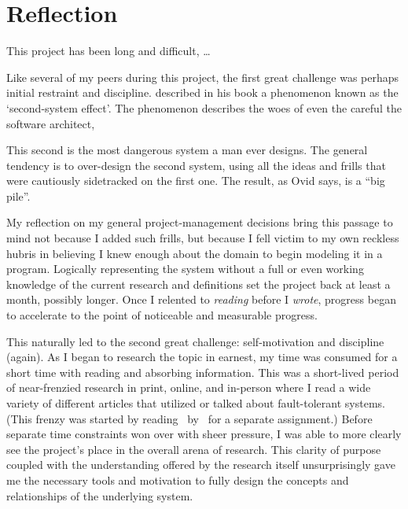\section{Reflection}
\label{sec:reflection}

This project has been long and difficult, \dots

Like several of my peers during this project,
  the first great challenge was perhaps initial restraint and discipline.
\citeauthor{brooks:mythical-man-month} described in his book 
  a phenomenon known as the \enquote*{second-system effect}.
The phenomenon describes the woes of even the careful the software architect,
\begin{displayquote}
  This second is the most dangerous system a man ever designs.
  \Elide
  The general tendency is to over-design the second system,
    using all the ideas and frills that were cautiously sidetracked on the first one.
  The result, as Ovid says, is a \enquote{big pile}.
\end{displayquote}
My reflection on my general project-management decisions bring this passage to mind
  not because I added such frills, but because I fell victim to my own reckless hubris
  in believing I knew enough about the domain to begin modeling it in a program.
%
Logically representing the system without a full \Dash or even working \Dash
  knowledge of the current research and definitions set the project back at least a month, possibly longer.
Once I relented to \emph{reading} before I \emph{wrote},
  progress began to accelerate to the point of noticeable and measurable progress.

This naturally led to the second great challenge: self-motivation and discipline (again).
As I began to research the topic in earnest,
  my time was consumed for a short time with reading and absorbing information.
This was a short-lived period of near-frenzied research
  \Dash in print, online, and in-person \Dash
  where I read a wide variety of different articles that utilized or talked about fault-tolerant systems.
(This frenzy was started by reading~
  by~\citeauthor{goddard:ssa--k-distance} for a separate assignment.)
Before separate time constraints won over with sheer pressure,
  I was able to more clearly see the project's place in the overall arena of research.
This clarity of purpose \Dash
  coupled with the understanding offered by the research itself \Dash
  unsurprisingly gave me the necessary tools and motivation to fully design
  the concepts and relationships of the underlying system.


